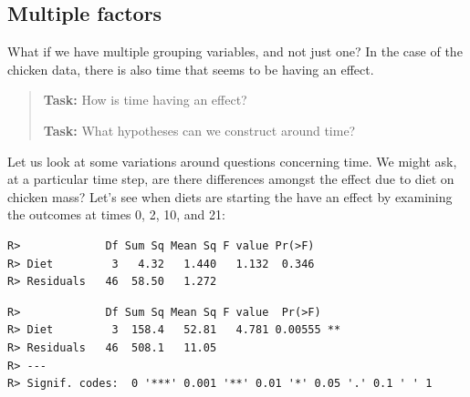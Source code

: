 \documentclass[english,10pt,a4paper,oneside]{book}
\newenvironment{Shaded}{\begin{snugshade}}{\end{snugshade}}
\newcommand{\KeywordTok}[1]{\textcolor[rgb]{0.13,0.29,0.53}{\textbf{#1}}}
\newcommand{\DataTypeTok}[1]{\textcolor[rgb]{0.13,0.29,0.53}{#1}}
\newcommand{\DecValTok}[1]{\textcolor[rgb]{0.00,0.00,0.81}{#1}}
\newcommand{\StringTok}[1]{\textcolor[rgb]{0.31,0.60,0.02}{#1}}
\newcommand{\OperatorTok}[1]{\textcolor[rgb]{0.81,0.36,0.00}{\textbf{#1}}}
\newcommand{\NormalTok}[1]{#1}
\theoremstyle{definition}
\theoremstyle{definition}
\theoremstyle{definition}
\theoremstyle{remark}
\begin{document}
\subsection{Multiple factors}\label{multiple-factors}

What if we have multiple grouping variables, and not just one? In the
case of the chicken data, there is also time that seems to be having an
effect.

\begin{quote}
\textbf{Task:} How is time having an effect?

\textbf{Task:} What hypotheses can we construct around time?
\end{quote}

Let us look at some variations around questions concerning time. We
might ask, at a particular time step, are there differences amongst the
effect due to diet on chicken mass? Let's see when diets are starting
the have an effect by examining the outcomes at times 0, 2, 10, and 21:

\begin{Shaded}
\end{Shaded}

\begin{verbatim}
R>             Df Sum Sq Mean Sq F value Pr(>F)
R> Diet         3   4.32   1.440   1.132  0.346
R> Residuals   46  58.50   1.272
\end{verbatim}

\begin{Shaded}
\end{Shaded}

\begin{verbatim}
R>             Df Sum Sq Mean Sq F value  Pr(>F)   
R> Diet         3  158.4   52.81   4.781 0.00555 **
R> Residuals   46  508.1   11.05                   
R> ---
R> Signif. codes:  0 '***' 0.001 '**' 0.01 '*' 0.05 '.' 0.1 ' ' 1
\end{verbatim}
\end{document}
